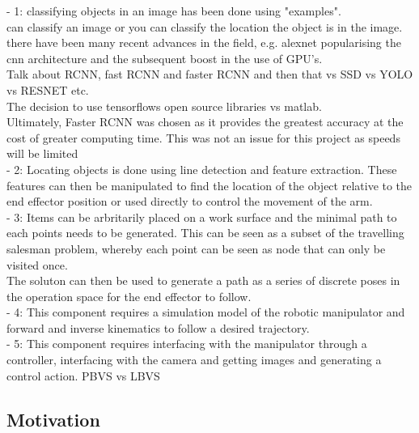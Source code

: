 \documentclass{UoNMCHA}
\numberwithin{equation}{section}
\begin{document}
    - 1: classifying objects in an image has been done using "examples".\\
    can classify an image or you can classify the location the object is in the image.\\
     there have been many recent advances in the field, e.g. alexnet popularising the cnn architecture and the subsequent boost in the use of GPU's.\\
     Talk about RCNN, fast RCNN and faster RCNN and then that vs SSD vs YOLO vs RESNET etc.\\
     The decision to use tensorflows open source libraries vs matlab.\\
     Ultimately, Faster RCNN was chosen as it provides the greatest accuracy at the cost of greater computing time. This was not an issue for this project as speeds will be limited \\
    
    - 2: Locating objects is done using line detection and feature extraction. These features can then be manipulated to find the location of the object relative to the end effector position or used directly to control the movement of the arm.\\
    
    - 3: Items can be arbritarily placed on a work surface and the minimal path to each points needs to be generated. This can be seen as a subset of the travelling salesman problem, whereby each point can be seen as node that can only be visited once.\\
    The soluton can  then be used to generate a path as a series of discrete poses in the operation space for the end effector to follow.\\
    
    - 4: This component requires a simulation model of the robotic manipulator and forward and inverse kinematics to follow a desired trajectory. \\
    - 5: This component requires interfacing with the manipulator through a controller, interfacing with the camera and getting images and generating a control action. PBVS vs LBVS
    
    

\subsection{Motivation}
\end{document}
